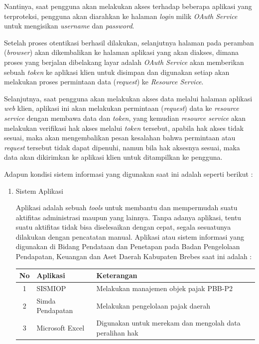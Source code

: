 \documentclass[pdftex,12pt, oneside]{article}
\begin{document}
\begin{enumerate}
\begin{enumerate}
Nantinya, saat pengguna akan melakukan akses terhadap beberapa aplikasi yang terproteksi, pengguna akan diarahkan ke halaman \textit{login} milik \textit{OAuth Service} untuk mengisikan \textit{username} dan \textit{password}. 

Setelah proses otentikasi berhasil dilakukan, selanjutnya halaman pada peramban (\textit{browser}) akan dikembalikan ke halaman aplikasi yang akan diakses, dimana proses yang berjalan dibelakang layar adalah \textit{OAuth Service} akan memberikan sebuah \textit{token} ke aplikasi klien untuk disimpan dan digunakan setiap akan melakukan proses permintaan data (\textit{request}) ke \textit{Resource Service}. 

Selanjutnya, saat pengguna akan melakukan akses data melalui halaman aplikasi \textit{web} klien, aplikasi ini akan melakukan permintaan (\textit{request}) data ke \textit{resource service} dengan membawa data dan \textit{token}, yang kemudian \textit{resource service} akan melakukan verifikasi hak akses melalui \textit{token} tersebut, apabila hak akses tidak sesuai, maka akan mengembalikan pesan kesalahan bahwa permintaan atau \textit{request} tersebut tidak dapat dipenuhi, namun bila hak aksesnya sesuai, maka data akan dikirimkan ke aplikasi klien untuk ditampilkan ke pengguna.

\end{enumerate}

Adapun kondisi sistem informasi yang digunakan saat ini adalah seperti berikut :

\begin{enumerate}
	\item Sistem Aplikasi 
	
Aplikasi adalah sebuah \textit{tools} untuk membantu dan mempermudah suatu aktifitas administrasi maupun yang lainnya. Tanpa adanya aplikasi, tentu suatu aktifitas tidak bisa diselesaikan dengan cepat, segala sesuatunya dilakukan dengan pencatatan manual. Aplikasi atau sistem informasi yang digunakan di Bidang Pendataan dan Penetapan pada Badan Pengelolaan Pendapatan, Keuangan dan Aset Daerah Kabupaten Brebes saat ini adalah :

\begin{table}[H]
	\centering
	\begin{tabular}{| c | l | l |}
		\hline
		No & Aplikasi & Keterangan \\
		\hline
		1 & SISMIOP & Melakukan manajemen objek pajak PBB-P2 \\
		\hline
		2 & Simda Pendapatan & Melakukan pengelolaan pajak daerah \\
		\hline
		3 & Microsoft Excel & Digunakan untuk merekam dan mengolah data peralihan hak \\
		\hline
	\end{tabular}
\end{table}


\end{enumerate}
\end{enumerate}
\end{document}

